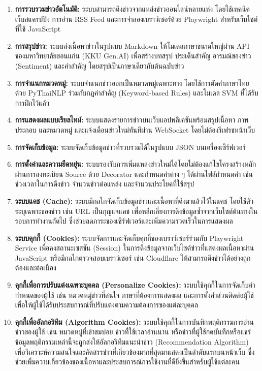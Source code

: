 \begin{enumerate}[label=\arabic*)]
    \item \textbf{การรวบรวมข่าวอัตโนมัติ:} ระบบสามารถดึงข่าวจากแหล่งข่าวออนไลน์หลายแห่ง โดยใช้เทคนิคเว็บสแครปปิง การอ่าน RSS Feed และการจำลองเบราว์เซอร์ด้วย Playwright สำหรับเว็บไซต์ที่ใช้ JavaScript
    \item \textbf{การสรุปข่าว:} ระบบส่งเนื้อหาข่าวในรูปแบบ Markdown ให้โมเดลภาษาขนาดใหญ่ผ่าน API ของมหาวิทยาลัยขอนแก่น (KKU Gen.AI) เพื่อสร้างบทสรุป ประเด็นสำคัญ อารมณ์ของข่าว (Sentiment) และคำสำคัญ โดยสรุปเป็นภาษาเดียวกับต้นฉบับข่าว
    \item \textbf{การจำแนกหมวดหมู่:} ระบบจำแนกข่าวออกเป็นหมวดหมู่เฉพาะทาง โดยใช้การตัดคำภาษาไทยด้วย PyThaiNLP ร่วมกับกฎคำสำคัญ (Keyword-based Rules) และโมเดล SVM ที่ได้รับการฝึกไว้แล้ว
    \item \textbf{การแสดงผลแบบเรียลไทม์:} ระบบแสดงรายการข่าวบนเว็บแอปพลิเคชันพร้อมสรุปเนื้อหา ภาพประกอบ และหมวดหมู่ และแจ้งเตือนข่าวใหม่ทันทีผ่าน WebSocket โดยไม่ต้องรีเฟรชหน้าเว็บ
    \item \textbf{การจัดเก็บข้อมูล:} ระบบจัดเก็บข้อมูลข่าวที่รวบรวมได้ในรูปแบบ JSON บนเครื่องเซิร์ฟเวอร์
    \item \textbf{การตั้งค่าและความยืดหยุ่น:} ระบบรองรับการเพิ่มแหล่งข่าวใหม่ได้โดยไม่ต้องแก้ไขโครงสร้างหลัก ผ่านการลงทะเบียน Source ด้วย Decorator และกำหนดค่าต่าง ๆ ได้ผ่านไฟล์กำหนดค่า เช่น ช่วงเวลาในการดึงข่าว จำนวนข่าวต่อแหล่ง และจำนวนประโยคที่ใช้สรุป
    \item \textbf{ระบบแคช (Cache):} ระบบมีกลไกจัดเก็บข้อมูลข่าวและเนื้อหาที่ดึงมาแล้วไว้ในแคช โดยใช้ตัวระบุเฉพาะของข่าว เช่น URL เป็นกุญแจแคช เพื่อหลีกเลี่ยงการดึงข้อมูลซ้ำจากเว็บไซต์ต้นทางในรอบการทำงานถัดไป ซึ่งช่วยลดภาระของเซิร์ฟเวอร์และเพิ่มความรวดเร็วในการแสดงผล
    \item \textbf{ระบบคุกกี้ (Cookies):} ระบบจัดการและจัดเก็บคุกกี้ของเบราว์เซอร์ร่วมกับ Playwright Service เพื่อคงสถานะเซสชัน (Session) ในการดึงข้อมูลจากเว็บไซต์ข่าวที่แสดงผลเนื้อหาผ่าน JavaScript หรือมีกลไกตรวจสอบเบราว์เซอร์ เช่น Cloudflare ให้สามารถดึงข่าวได้อย่างถูกต้องและต่อเนื่อง
    \item \textbf{คุกกี้เพื่อการปรับแต่งเฉพาะบุคคล (Personalize Cookies):} ระบบใช้คุกกี้ในการจัดเก็บค่ากำหนดของผู้ใช้ เช่น หมวดหมู่ข่าวที่สนใจ ภาษาที่ต้องการแสดงผล และการตั้งค่าส่วนติดต่อผู้ใช้ เพื่อให้ผู้ใช้ได้รับประสบการณ์ที่ปรับแต่งตามความต้องการของแต่ละบุคคล
    \item \textbf{คุกกี้เพื่ออัลกอริทึม (Algorithm Cookies):} ระบบใช้คุกกี้ในการบันทึกพฤติกรรมการอ่านข่าวของผู้ใช้ เช่น หมวดหมู่ที่เข้าชมบ่อย ข่าวที่ใช้เวลาอ่านนาน หรือข่าวที่ผู้ใช้กดบันทึกหรือแชร์ ข้อมูลพฤติกรรมเหล่านี้จะถูกส่งให้อัลกอริทึมแนะนำข่าว (Recommendation Algorithm) เพื่อวิเคราะห์ความสนใจและคัดสรรข่าวที่เกี่ยวข้องมากที่สุดมาแสดงเป็นลำดับแรกบนหน้าเว็บ ซึ่งช่วยเพิ่มความเกี่ยวข้องของเนื้อหาและประสบการณ์การใช้งานที่ดียิ่งขึ้นสำหรับผู้ใช้แต่ละคน
\end{enumerate}

